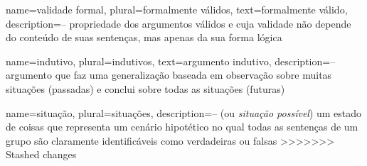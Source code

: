   {
  name=validade formal,
  plural=formalmente válidos,
  text=formalmente válido,
  description={-- propriedade dos argumentos válidos e cuja validade não depende do conteúdo de suas sentenças, mas apenas da sua forma lógica}
  }
  
  {
  name=indutivo,
  plural=indutivos,
  text=argumento indutivo,
  description={-- argumento que faz uma generalização baseada em observação sobre muitas situações (passadas) e conclui sobre todas as situações (futuras)}
  }
  
    {
    name=situação,
    plural=situações,
    description={-- (ou \textit{situação possível}) um estado de coisas que representa um cenário hipotético no qual todas as sentenças de um grupo são claramente identificáveis como verdadeiras ou falsas}
    }
>>>>>>> Stashed changes
